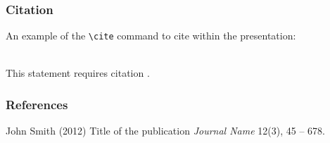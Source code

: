 \documentclass[t]{beamer}
\begin{document}

\begin{frame}[fragile] %
\frametitle{Citation}
An example of the \verb|\cite| command to cite within the presentation:\\~

This statement requires citation \cite{p1}.
\end{frame}


\begin{frame}
\frametitle{References}
\footnotesize{
\begin{thebibliography}{99} %
 John Smith (2012)
\newblock Title of the publication
\newblock \emph{Journal Name} 12(3), 45 -- 678.
\end{thebibliography}
}
\end{frame}
\end{document}
